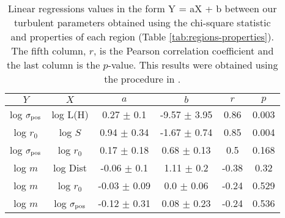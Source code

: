 \begin{table*}
\begin{center}
\caption{Linear regressions values in the form Y = aX + b between our turbulent parameters obtained using the chi-square statistic and properties of each region (Table \ref{tab:regions-properties}). The fifth column, $r$, is the Pearson correlation coefficient and the last column is the $p$-value. This results were obtained using the procedure in \citet{2007ApJ...665.1489K}.}
\begin{tabular}{cccccc}
\hline
            $Y$ &                   $X$ &                 $a$ &                 $b$ &       $r$ &      $p$ \\
\hline
 log $\sigma_{\mathrm{pos}}$ &            log L(H) &    0.27 $\pm$ 0.1 &  -9.57 $\pm$ 3.95 &   0.86 &  0.003 \\
    log $r_0$ &             log $S$ &   0.94 $\pm$ 0.34 &  -1.67 $\pm$ 0.74 &   0.85 &  0.004 \\
 log $\sigma_{\mathrm{pos}}$ &         log $r_{0}$ &   0.17 $\pm$ 0.18 &   0.68 $\pm$ 0.13 &    0.5 &  0.168 \\
      log $m$ &            log Dist &   -0.06 $\pm$ 0.1 &    1.11 $\pm$ 0.2 &  -0.38 &   0.32 \\
      log $m$ &         log $r_{0}$ &  -0.03 $\pm$ 0.09 &    0.0 $\pm$ 0.06 &  -0.24 &  0.529 \\
      log $m$ &        log $\sigma_{\mathrm{pos}}$ &  -0.12 $\pm$ 0.31 &   0.08 $\pm$ 0.23 &  -0.24 &  0.536 \\
\bottomrule
\end{tabular}\label{tab:RestStats}
\end{center}
\end{table*}


